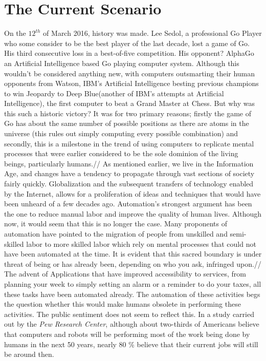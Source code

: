 \section{The Current Scenario}
\label{sec:-current}
On the $12^{th}$ of March 2016, history was made. Lee Sedol, a professional Go Player who some consider to be the best player of the last decade, lost a game of Go. His third consecutive loss in a best-of-five competition. His opponent? AlphaGo an Artificial Intelligence based Go playing computer system\cite{alphagolee}. Although this wouldn't be considered anything new, with computers outsmarting their human opponents from Watson, IBM's Artificial Intelligence besting previous champions to win Jeopardy\cite{watsonjeopardy} to Deep Blue(another of IBM's attempts at Artificial Intelligence), the first computer to beat a Grand Master at Chess. But why was this such a historic victory? It was for two primary reasons; firstly the game of Go has about the same number of possible positions as there are atoms in the universe (this rules out simply computing every possible combination) and secondly, this is a milestone in the trend of using computers to replicate mental processes that were earlier considered to be the sole dominion of the living beings, particularly humans.//
As mentioned earlier, we live in the Information Age, and changes have a tendency to propagate through vast sections of society fairly quickly. Globalization and the subsequent transfers of technology enabled by the Internet, allows for a proliferation of ideas and techniques that would have been unheard of a few decades ago. Automation's strongest argument has been the one to reduce manual labor and improve the quality of human lives. Although now, it would seem that this is no longer the case. Many proponents of automation have pointed to the migration of people from unskilled and semi-skilled labor to more skilled labor which rely on mental processes that could not have been automated at the time. It is evident that this sacred boundary is under threat of being or has already been, depending on who you ask, infringed upon.//
	The advent of Applications that have improved accessibility to services, from planning your week to simply setting an alarm or a reminder to do your taxes, all these tasks have been automated already. The automation of these activities begs the question whether this would make humans obsolete in performing these activities. The public sentiment does not seem to reflect this. In a study carried out by the \textit{Pew Research Center}\cite{workforcepew}, although about two-thirds of Americans believe that computers and robots will be performing most of the work being done by humans in the next 50 years, nearly 80 \% believe that their current jobs will still be around then.\\
